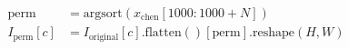 \documentclass[preview,border=4pt]{standalone}
\begin{document}
\begin{align}
\mathrm{perm} &= \mathrm{argsort}\left(x_{\mathrm{chen}}[1000:1000+N]\right) \\
I_{\mathrm{perm}}[c] &= I_{\mathrm{original}}[c].\mathrm{flatten()}[\mathrm{perm}].\mathrm{reshape}(H,W)
\end{align}
\end{document}
